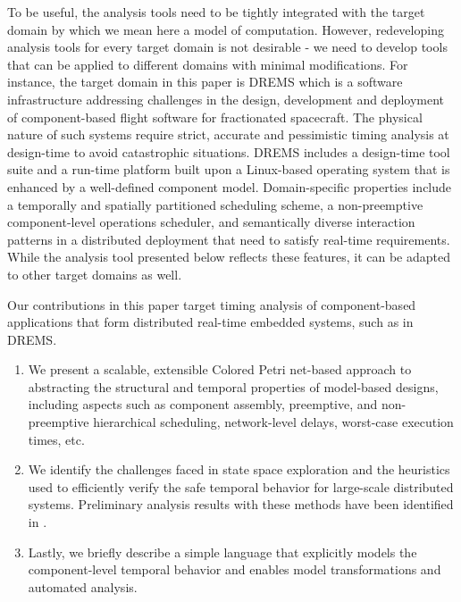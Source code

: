 To be useful, the analysis tools need to be tightly integrated with the target domain by which we mean here a model of computation. However, redeveloping analysis tools for every target domain is not desirable - we need to develop tools that can be applied to different domains with minimal modifications. For instance, the target domain in this paper is DREMS \cite{DREMS13Software} which is a software infrastructure addressing challenges in the design, development and deployment of component-based flight software for fractionated spacecraft. The physical nature of such systems require strict, accurate and pessimistic timing analysis at design-time to avoid catastrophic situations. DREMS includes a design-time tool suite and a run-time platform built upon a Linux-based operating system that is enhanced by a well-defined component model. Domain-specific properties include a temporally and spatially partitioned scheduling scheme, a non-preemptive component-level operations scheduler, and semantically diverse interaction patterns in a distributed deployment that need to satisfy real-time requirements. While the analysis tool presented below reflects these features, it can be adapted to other target domains as well. 

Our contributions in this paper target timing analysis of component-based applications that form distributed real-time embedded systems, such as in DREMS. 

\begin{enumerate}
	\item We present a scalable, extensible Colored Petri net-based \cite{CPN} approach to abstracting the structural and temporal properties of model-based designs, including aspects such as component assembly, preemptive, and non-preemptive hierarchical scheduling, network-level delays, worst-case execution times, etc.
	\item We identify the challenges faced in state space exploration and the heuristics used to efficiently verify the safe temporal behavior for large-scale distributed systems. Preliminary analysis results with these methods have been identified in \cite{MoDeVVa}.
	\item Lastly, we briefly describe %
	a simple language that explicitly models the  component-level temporal behavior and enables model transformations and automated analysis.
\end{enumerate} 
 
 
